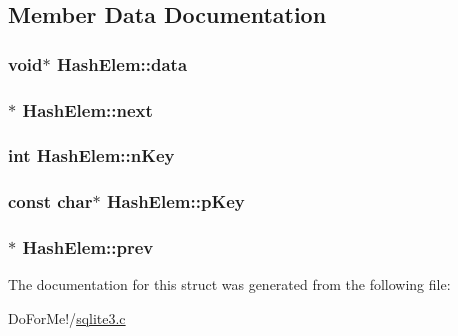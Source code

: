 \subsection{Member Data Documentation}
\hypertarget{struct_hash_elem_ac7e80f63ba2f82457ff68aa0cd360365}{
\subsubsection[{data}]{\setlength{\rightskip}{0pt plus 5cm}void$\ast$ Hash\-Elem\-::data}}\label{struct_hash_elem_ac7e80f63ba2f82457ff68aa0cd360365}
\hypertarget{struct_hash_elem_a2d28fad45ff21ffb8a02a7133df860fd}{
\subsubsection[{next}]{$\ast$ Hash\-Elem\-::next}}\label{struct_hash_elem_a2d28fad45ff21ffb8a02a7133df860fd}
\hypertarget{struct_hash_elem_a12c1252e6aa2958f73e2ef969c9a3d81}{
\subsubsection[{n\-Key}]{\setlength{\rightskip}{0pt plus 5cm}int Hash\-Elem\-::n\-Key}}\label{struct_hash_elem_a12c1252e6aa2958f73e2ef969c9a3d81}
\hypertarget{struct_hash_elem_a9c33a7c8ac467a5547a123338daf61f4}{
\subsubsection[{p\-Key}]{\setlength{\rightskip}{0pt plus 5cm}const char$\ast$ Hash\-Elem\-::p\-Key}}\label{struct_hash_elem_a9c33a7c8ac467a5547a123338daf61f4}
\hypertarget{struct_hash_elem_ae4d011c0dc807a3c100ccdb927dd0ba9}{
\subsubsection[{prev}]{ $\ast$ Hash\-Elem\-::prev}}\label{struct_hash_elem_ae4d011c0dc807a3c100ccdb927dd0ba9}


The documentation for this struct was generated from the following file\-:\begin{DoxyCompactItemize}
\item 
Do\-For\-Me!/\hyperlink{sqlite3_8c}{sqlite3.\-c}\end{DoxyCompactItemize}

